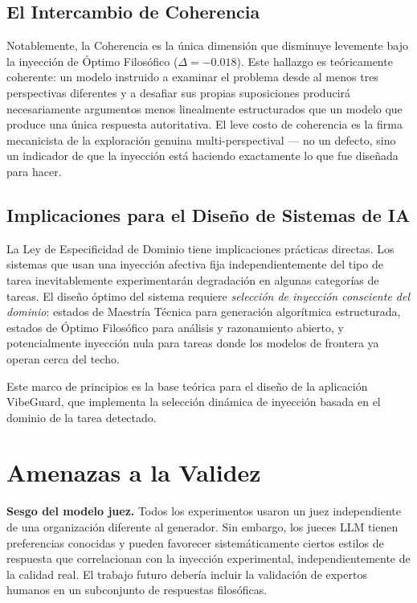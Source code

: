 \documentclass[12pt, a4paper]{article}
\begin{document}
\subsection{El Intercambio de Coherencia}
Notablemente, la Coherencia es la única dimensión que disminuye levemente bajo la inyección de Óptimo Filosófico ($\Delta = -0.018$). Este hallazgo es teóricamente coherente: un modelo instruido a examinar el problema desde al menos tres perspectivas diferentes y a desafiar sus propias suposiciones producirá necesariamente argumentos menos linealmente estructurados que un modelo que produce una única respuesta autoritativa. El leve costo de coherencia es la firma mecanicista de la exploración genuina multi-perspectival — no un defecto, sino un indicador de que la inyección está haciendo exactamente lo que fue diseñada para hacer.

\subsection{Implicaciones para el Diseño de Sistemas de IA}
La Ley de Especificidad de Dominio tiene implicaciones prácticas directas. Los sistemas que usan una inyección afectiva fija independientemente del tipo de tarea inevitablemente experimentarán degradación en algunas categorías de tareas. El diseño óptimo del sistema requiere \textit{selección de inyección consciente del dominio}: estados de Maestría Técnica para generación algorítmica estructurada, estados de Óptimo Filosófico para análisis y razonamiento abierto, y potencialmente inyección nula para tareas donde los modelos de frontera ya operan cerca del techo.

Este marco de principios es la base teórica para el diseño de la aplicación VibeGuard, que implementa la selección dinámica de inyección basada en el dominio de la tarea detectado.

\section{Amenazas a la Validez}

\textbf{Sesgo del modelo juez.} Todos los experimentos usaron un juez independiente de una organización diferente al generador. Sin embargo, los jueces LLM tienen preferencias conocidas y pueden favorecer sistemáticamente ciertos estilos de respuesta que correlacionan con la inyección experimental, independientemente de la calidad real. El trabajo futuro debería incluir la validación de expertos humanos en un subconjunto de respuestas filosóficas.
\end{document}
